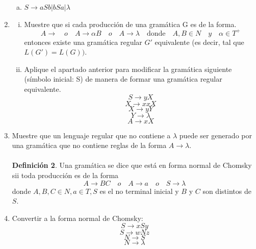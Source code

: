 \documentclass{article}
\begin{document}
\begin{enumerate}[1.]
    \begin{enumerate}[a)]
      \item
        $S \rightarrow aSb | bSa | \lambda$
    \end{enumerate} 
  \item
    \begin{enumerate}[i.]
      \item
        Muestre que si cada producción de una gramática G es de la forma.
        \[ A \rightarrow \quad o \quad A \rightarrow \alpha B \quad o \quad A \rightarrow \lambda \quad \text{donde} 
        \quad A,B \in N \quad y \quad \alpha \in T^{+} \]
        entonces existe una gramática regular $G'$ equivalente (es decir, tal que $L(G') = L(G))$.
      \item
        Aplique el apartado anterior para modificar la gramática siguiente (símbolo inicial: S) de manera de formar
        una gramática regular equivalente.
        \[ S \rightarrow yX \]
        \[ X \rightarrow xxX \]
        \[ X \rightarrow yY \]
        \[ Y \rightarrow \lambda \]
        \[ A \rightarrow xX \]
    \end{enumerate}
  \item
    Muestre que un lenguaje regular que no contiene a $\lambda$ puede ser generado por una gramática que no contiene
    reglas de la forma $A \rightarrow \lambda$. \\ \\
    \textbf{Definición 2}. Una gramática se dice que está en forma normal de Chomsky sii toda producción es de la forma
    \[ A \rightarrow BC \quad o \quad A \rightarrow a \quad o \quad S \rightarrow \lambda \]
    donde $A,B,C \in N, a \in T, S$ es el no terminal inicial y $B$ y $C$ son distintos de $S$.
  \item
    Convertir a la forma normal de Chomsky:
    \[ S \rightarrow xSy \]
    \[ S \rightarrow wNz \]
    \[ N \rightarrow S\]
    \[ N \rightarrow \lambda \]


\end{enumerate}
\end{document}
